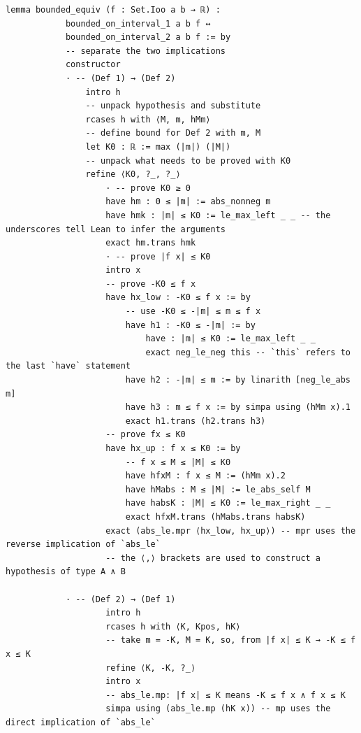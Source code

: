 \documentclass[a4paper,11pt]{article}
\theoremstyle{plain}
\begin{document}
	\begin{lstlisting}[caption={The two definitions of boundedness are equivalent.}, label={list:6}]
		lemma bounded_equiv (f : Set.Ioo a b → ℝ) :
			bounded_on_interval_1 a b f ↔
			bounded_on_interval_2 a b f := by
			-- separate the two implications
			constructor
			· -- (Def 1) → (Def 2)
				intro h
				-- unpack hypothesis and substitute
				rcases h with ⟨M, m, hMm⟩
				-- define bound for Def 2 with m, M
				let K0 : ℝ := max (|m|) (|M|)
				-- unpack what needs to be proved with K0
				refine ⟨K0, ?_, ?_⟩
					· -- prove K0 ≥ 0
					have hm : 0 ≤ |m| := abs_nonneg m
					have hmk : |m| ≤ K0 := le_max_left _ _ -- the underscores tell Lean to infer the arguments
					exact hm.trans hmk
					· -- prove |f x| ≤ K0
					intro x
					-- prove -K0 ≤ f x
					have hx_low : -K0 ≤ f x := by
						-- use -K0 ≤ -|m| ≤ m ≤ f x
						have h1 : -K0 ≤ -|m| := by
							have : |m| ≤ K0 := le_max_left _ _
							exact neg_le_neg this -- `this` refers to the last `have` statement
						have h2 : -|m| ≤ m := by linarith [neg_le_abs m]
						have h3 : m ≤ f x := by simpa using (hMm x).1
						exact h1.trans (h2.trans h3)
					-- prove fx ≤ K0
					have hx_up : f x ≤ K0 := by
						-- f x ≤ M ≤ |M| ≤ K0
						have hfxM : f x ≤ M := (hMm x).2
						have hMabs : M ≤ |M| := le_abs_self M
						have habsK : |M| ≤ K0 := le_max_right _ _
						exact hfxM.trans (hMabs.trans habsK)
					exact (abs_le.mpr ⟨hx_low, hx_up⟩) -- mpr uses the reverse implication of `abs_le`
					-- the ⟨,⟩ brackets are used to construct a hypothesis of type A ∧ B
			
			· -- (Def 2) → (Def 1)
					intro h
					rcases h with ⟨K, Kpos, hK⟩
					-- take m = -K, M = K, so, from |f x| ≤ K → -K ≤ f x ≤ K
					refine ⟨K, -K, ?_⟩
					intro x
					-- abs_le.mp: |f x| ≤ K means -K ≤ f x ∧ f x ≤ K
					simpa using (abs_le.mp (hK x)) -- mp uses the direct implication of `abs_le`
	\end{lstlisting}
	
\end{document}
